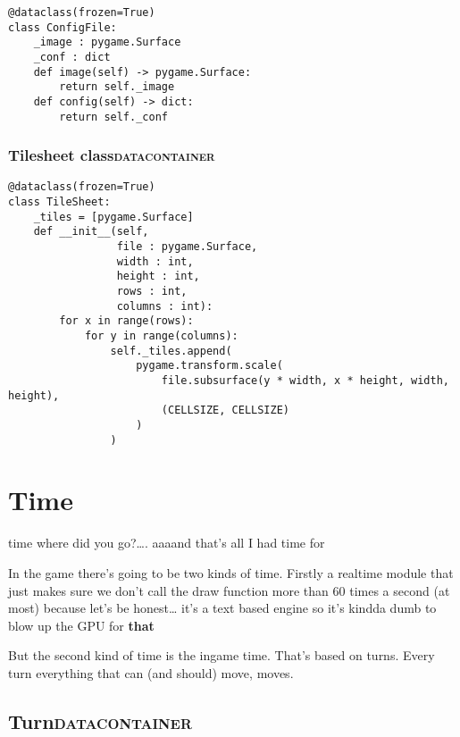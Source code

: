 \documentclass[11pt]{article}
\begin{document}
\begin{verbatim}
@dataclass(frozen=True)
class ConfigFile:
    _image : pygame.Surface
    _conf : dict
    def image(self) -> pygame.Surface:
        return self._image
    def config(self) -> dict:
        return self._conf
\end{verbatim}



\subsubsection{Tilesheet class\hfill{}\textsc{datacontainer}}
\label{sec:org8f74aac}



\begin{verbatim}
@dataclass(frozen=True)
class TileSheet:
    _tiles = [pygame.Surface]
    def __init__(self,
                 file : pygame.Surface,
                 width : int,
                 height : int,
                 rows : int,
                 columns : int):
        for x in range(rows):
            for y in range(columns):
                self._tiles.append(
                    pygame.transform.scale(
                        file.subsurface(y * width, x * height, width, height),
                        (CELLSIZE, CELLSIZE)
                    )
                )
\end{verbatim}


\section{Time}
\label{sec:org801fb4e}

\begin{center}
time where did you go?\ldots{}. aaaand that's all I had time for
\end{center}

In the game there's going to be two kinds of time. Firstly a realtime module that just makes sure we don't call the draw function more than 60 times a second (at most) because let's be honest\ldots{} it's a text based engine so it's kindda dumb to blow up the GPU for \textbf{that}

But the second kind of time is the ingame time. That's based on turns. Every turn everything that can (and should) move, moves.

\subsection{Turn\hfill{}\textsc{datacontainer}}
\label{sec:orgfc4f286}
\end{document}
